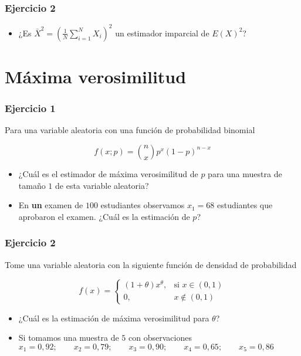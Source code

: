 \documentclass[
]{book}
\providecommand{\tightlist}{%
  \setlength{\itemsep}{0pt}\setlength{\parskip}{0pt}}
\begin{document}
\hypertarget{ejercicio-2-6}{%
\subsubsection{Ejercicio 2}\label{ejercicio-2-6}}

\begin{itemize}
\tightlist
\item
  ¿Es \(\bar{X}^2=(\frac{1}{N}\sum_{i=1}^N X_i)^2\) un estimador imparcial de \(E(X)^2\)?
\end{itemize}

\hypertarget{muxe1xima-verosimilitud}{%
\section{Máxima verosimilitud}\label{muxe1xima-verosimilitud}}

\hypertarget{ejercicio-1-7}{%
\subsubsection{Ejercicio 1}\label{ejercicio-1-7}}

Para una variable aleatoria con una función de probabilidad binomial

\[f(x; p)=\binom n x p^x(1-p)^{n-x}\]

\begin{itemize}
\item
  ¿Cuál es el estimador de máxima verosimilitud de \(p\) para una muestra de tamaño \(1\) de esta variable aleatoria?
\item
  En \textbf{un} examen de \(100\) estudiantes observamos \(x_1=68\) estudiantes que aprobaron el examen. ¿Cuál es la estimación de \(p\)?
\end{itemize}

\hypertarget{ejercicio-2-7}{%
\subsubsection{Ejercicio 2}\label{ejercicio-2-7}}

Tome una variable aleatoria con la siguiente función de densidad de probabilidad

\[
f(x)=
\begin{cases}
    (1+\theta)x^\theta,& \text{si } x\in (0,1)\\
    0,&  x\notin (0,1)
\end{cases}
\]

\begin{itemize}
\item
  ¿Cuál es la estimación de máxima verosimilitud para \(\theta\)?
\item
  Si tomamos una muestra de \(5\) con observaciones
  \(x_1 = 0,92; \qquad x_2 = 0,79; \qquad x_3 = 0,90; \qquad x_4 = 0,65; \qquad x_5 = 0,86\)
\end{itemize}
\end{document}
